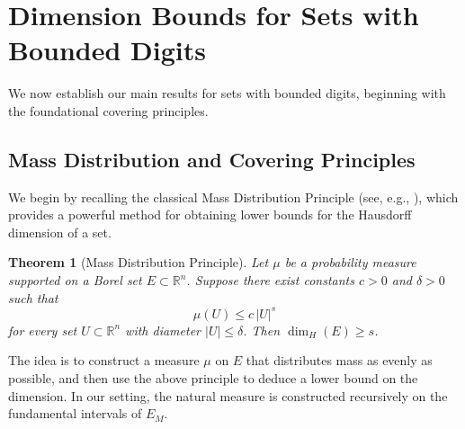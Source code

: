 \documentclass[12pt]{article}
\newtheorem{theorem}{Theorem}[section]
\numberwithin{equation}{section}
\begin{document}


%

\section{Dimension Bounds for Sets with Bounded Digits}

We now establish our main results for sets with bounded digits, beginning with the foundational covering principles.

\subsection{Mass Distribution and Covering Principles}

{We begin by recalling the classical Mass Distribution Principle (see, e.g., \cite{Falconer2004}), which provides a powerful method for obtaining lower bounds for the Hausdorff dimension of a set.
%
\begin{theorem}[Mass Distribution Principle]
Let $\mu$ be a probability measure supported on a Borel set $E \subset \mathbb{R}^n$. Suppose there exist constants $c > 0$ and $\delta > 0$ such that
\[
\mu(U) \le c \, |U|^s
\]
for every set $U \subset \mathbb{R}^n$ with diameter $|U| \le \delta$. Then $\dim_H(E) \ge s$.
\end{theorem}
%
The idea is to construct a measure $\mu$ on $E$ that distributes mass as evenly as possible, and then use the above principle to deduce a lower bound on the dimension. In our setting, the natural measure is constructed recursively on the fundamental intervals of $E_M$.}
\end{document}
